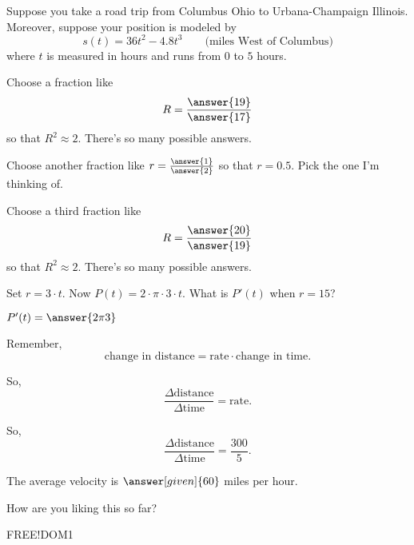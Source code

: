 \documentclass{ximera}
\begin{document}
Suppose you take a road trip from Columbus Ohio to Urbana-Champaign
Illinois. Moreover, suppose your position is modeled by
\[
s(t) = 36t^2 -4.8t^3 \qquad\text{(miles West of Columbus)} %
\]
where $t$ is measured in hours and runs from $0$ to $5$ hours. 

\begin{problem}
Choose a fraction like 
$$
R = \frac{\answer{19}}{\answer{17}}
$$
so that $R^2 \approx 2$.  There's so many possible answers.
\end{problem}

\begin{problem}
Choose another fraction like 
$r = \frac{\answer{1}}{\answer{2}}$
so that $r = 0.5$.  Pick the one I'm thinking of.
\end{problem}

\begin{problem}
Choose a third fraction like 
\[
R = \frac{\answer{20}}{\answer{19}}
\]
so that $R^2 \approx 2$.  There's so many possible answers.
\end{problem}

\begin{problem}\label{problem:whee}
  Set $r=3\cdot t$. Now $P(t) = 2\cdot \pi\cdot 3\cdot t$. What is
  $P'(t)$ when $r=15$?
  \begin{prompt}
    $P'(t)=\answer{2 \pi 3}$
  \end{prompt}
\end{problem}

\begin{problem}
  \label{problem:average-velocity}
  \begin{hint}
    Remember, 
    \[
    \text{change in distance} = \text{rate}\cdot\text{change in time}.
    \]
  \end{hint}
  \begin{hint}
    So, 
    \[
    \frac{\Delta\text{distance}}{\Delta\text{time}} = \text{rate}.
    \]
  \end{hint}
  \begin{hint}
    So, 
    \[
    \frac{\Delta\text{distance}}{\Delta\text{time}} = \frac{300}{5}.
    \]
  \end{hint}
  The average velocity is $\answer[given]{60}$ miles per hour.
\end{problem}

How are you liking this so far?
\begin{freeResponse}
FREE!DOM1
\end{freeResponse}
\end{document}
